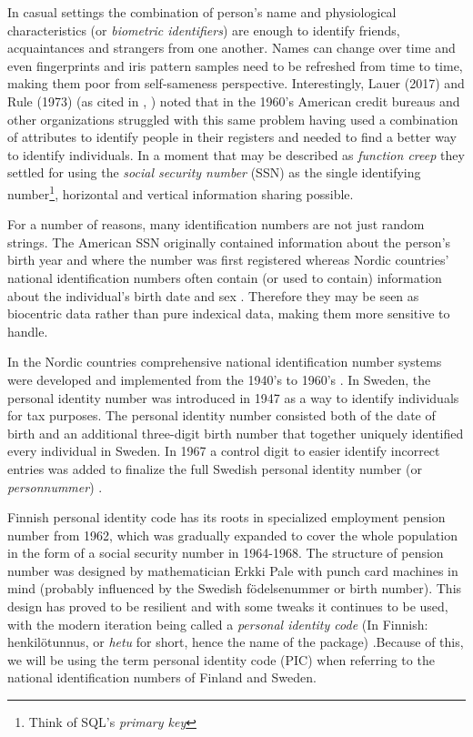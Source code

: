 In casual settings the combination of person's name and physiological characteristics (or \emph{biometric identifiers}) are enough to identify friends, acquaintances and strangers from one another. Names can change over time and even fingerprints and iris pattern samples need to be refreshed from time to time, making them poor from self-sameness perspective. Interestingly, Lauer (2017) and Rule (1973) (as cited in \citeauthor{brensinger2021}, \citeyear[31--32]{brensinger2021}) noted that in the 1960's American credit bureaus and other organizations struggled with this same problem having used a combination of attributes to identify people in their registers and needed to find a better way to identify individuals. In a moment that may be described as \emph{function creep} they settled for using the \emph{social security number} (SSN) as the single identifying number\footnote{Think of SQL's \emph{primary key}}, horizontal and vertical information sharing possible.

For a number of reasons, many identification numbers are not just random strings. The American SSN originally contained information about the person's birth year and where the number was first registered \citep[32]{brensinger2021} whereas Nordic countries' national identification numbers often contain (or used to contain) information about the individual's birth date and sex \citep{watson2010, salste2021}. Therefore they may be seen as biocentric data rather than pure indexical data, making them more sensitive to handle.

In the Nordic countries comprehensive national identification number systems were developed and implemented from the 1940's to 1960's \citep{watson2010}. In Sweden, the personal identity number was introduced in 1947 as a way to identify individuals for tax purposes. The personal identity number consisted both of the date of birth and an additional three-digit birth number that together uniquely identified every individual in Sweden. In 1967 a control digit to easier identify incorrect entries was added to finalize the full Swedish personal identity number (or \emph{personnummer}) \citep{johansson2003,scb2016}.

Finnish personal identity code has its roots in specialized employment pension number from 1962, which was gradually expanded to cover the whole population in the form of a social security number in 1964-1968. The structure of pension number was designed by mathematician Erkki Pale with punch card machines in mind (probably influenced by the Swedish födelsenummer or birth number). This design has proved to be resilient and with some tweaks it continues to be used, with the modern iteration being called a \emph{personal identity code} (In Finnish: henkilötunnus, or \emph{hetu} for short, hence the name of the package) \citep{salste2021}.Because of this, we will be using the term personal identity code (PIC) when referring to the national identification numbers of Finland and Sweden.

